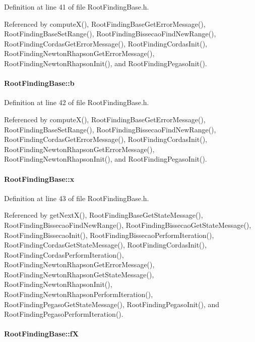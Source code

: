 Definition at line 41 of file RootFindingBase.h.

Referenced by computeX(), RootFindingBaseGetErrorMessage(), RootFindingBaseSetRange(), RootFindingBissecaoFindNewRange(), RootFindingCordasGetErrorMessage(), RootFindingCordasInit(), RootFindingNewtonRhapsonGetErrorMessage(), RootFindingNewtonRhapsonInit(), and RootFindingPegasoInit().\hypertarget{structRootFindingBase_c93fa64c78603a4d15443dfe470d7ff7}{
\paragraph[b]{ {\bf RootFindingBase::b}}\hfill}
\label{structRootFindingBase_c93fa64c78603a4d15443dfe470d7ff7}




Definition at line 42 of file RootFindingBase.h.

Referenced by computeX(), RootFindingBaseGetErrorMessage(), RootFindingBaseSetRange(), RootFindingBissecaoFindNewRange(), RootFindingCordasGetErrorMessage(), RootFindingCordasInit(), RootFindingNewtonRhapsonGetErrorMessage(), RootFindingNewtonRhapsonInit(), and RootFindingPegasoInit().\hypertarget{structRootFindingBase_0397226e2f7f9f37462275742ec280a3}{
\paragraph[x]{ {\bf RootFindingBase::x}}\hfill}
\label{structRootFindingBase_0397226e2f7f9f37462275742ec280a3}




Definition at line 43 of file RootFindingBase.h.

Referenced by getNextX(), RootFindingBaseGetStateMessage(), RootFindingBissecaoFindNewRange(), RootFindingBissecaoGetStateMessage(), RootFindingBissecaoInit(), RootFindingBissecaoPerformIteration(), RootFindingCordasGetStateMessage(), RootFindingCordasInit(), RootFindingCordasPerformIteration(), RootFindingNewtonRhapsonGetErrorMessage(), RootFindingNewtonRhapsonGetStateMessage(), RootFindingNewtonRhapsonInit(), RootFindingNewtonRhapsonPerformIteration(), RootFindingPegasoGetStateMessage(), RootFindingPegasoInit(), and RootFindingPegasoPerformIteration().\hypertarget{structRootFindingBase_220ad9f8e9d2424d8885675caf38e4da}{
\paragraph[fX]{ {\bf RootFindingBase::fX}}\hfill}
\label{structRootFindingBase_220ad9f8e9d2424d8885675caf38e4da}




